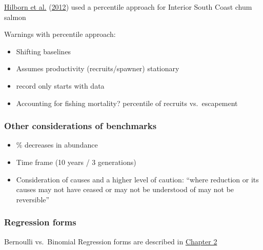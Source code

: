 \documentclass[11pt]{book}
\begin{document}
\protect\hyperlink{ref-hilborn_british_2012}{Hilborn et al.} (\protect\hyperlink{ref-hilborn_british_2012}{2012}) used a percentile approach for Interior South Coast chum salmon

Warnings with percentile approach:
\begin{itemize}

\item
  Shifting baselines
\item
  Assumes productivity (recruits/spawner) stationary
\item
  record only starts with data
\item
  Accounting for fishing mortality? percentile of recruits vs.~escapement
\end{itemize}
\hypertarget{other-considerations-of-benchmarks}{%
\subsubsection{Other considerations of benchmarks}\label{other-considerations-of-benchmarks}}
\begin{itemize}

\item
  \% decreases in abundance
\item
  Time frame (10 years / 3 generations)
\item
  Consideration of causes and a higher level of caution: ``where reduction or its causes may not have ceased or may not be understood of may not be reversible''
\end{itemize}
\hypertarget{regression-forms}{%
\subsubsection{Regression forms}\label{regression-forms}}

Bernoulli vs.~Binomial Regression forms are described in \protect\hyperlink{logistic-regression-lrps}{Chapter 2}
\end{document}

